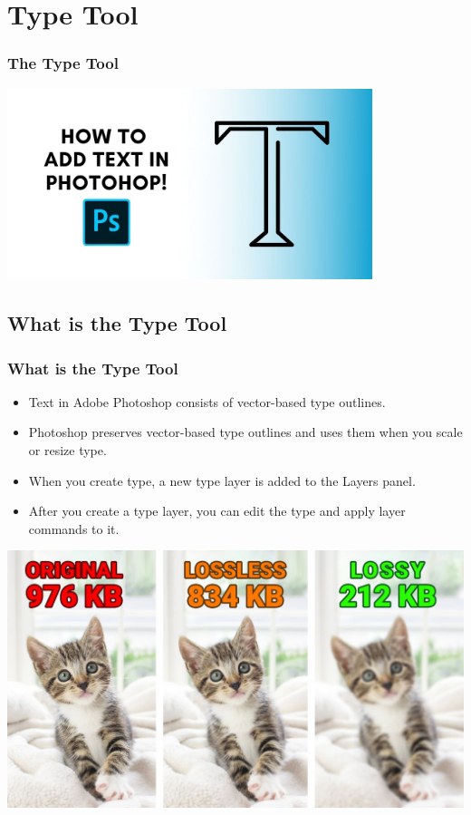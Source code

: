 \documentclass{beamer}
\begin{document}
	\section{Type Tool}
		\begin{frame}
		\frametitle{The Type Tool}
		\begin{center}
			\includegraphics[width = 0.8\textwidth]{images/HOW-TO-ADD-TEXT-PHOTOSHOP-THUMBNAIL.jpg}
		\end{center}
	\end{frame}
	
		\subsection{What is the Type Tool}
\begin{frame}
	\frametitle{What is the Type Tool}
	\begin{itemize}
		\item Text in Adobe Photoshop consists of vector-based type outlines.
		\item Photoshop preserves vector-based type outlines and uses them when you scale or resize type.
		\item When you create type, a new type layer is added to the Layers panel. 
		\item After you create a type layer, you can edit the type and apply layer commands to it.
	\end{itemize}
	\begin{center}
		\includegraphics[width = 1.0\textwidth]{images/maxresdefault.jpg}
	\end{center}
\end{frame}
\end{document}
